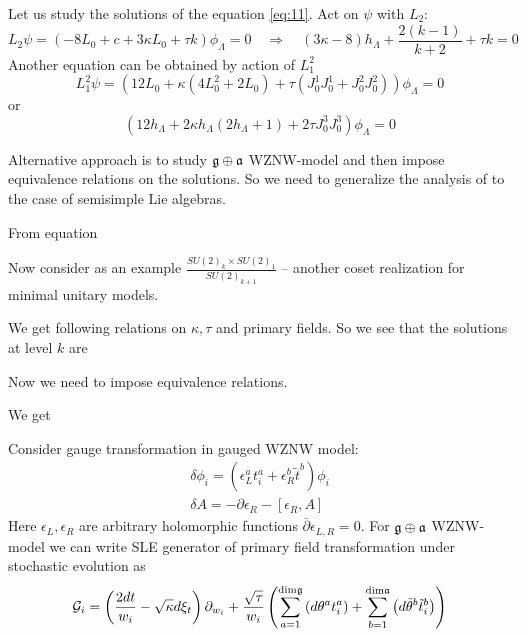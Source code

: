 Let us study the solutions of the equation \eqref{eq:11}. Act on $\psi$ with $L_{2}$:
\begin{equation}
  \label{eq:13}
  L_{2}\psi=(-8L_{0}+c+3\kappa L_{0}+\tau k)\phi_{\Lambda}=0\quad \Longrightarrow\quad  (3\kappa-8) h_{\Lambda}+\frac{2(k-1)}{k+2}+\tau k =0
\end{equation}
Another equation can be obtained by action of $L_{1}^{2}$
\begin{equation}
  \label{eq:15}
  L_{1}^{2}\psi = (12 L_{0} + \kappa(4 L_{0}^{2}+2 L_{0}) +\tau (J_{0}^{1}J_{0}^{1}+J_{0}^{2}J_{0}^{2}))\phi_{\Lambda}=0
\end{equation}
or
\begin{equation}
  \label{eq:16}
  \left(12 h_{\Lambda}+2\kappa h_{\Lambda} (2h_{\Lambda}+1) + 2 \tau J^{3}_{0}J^{3}_{0}\right) \phi_{\Lambda}=0
\end{equation}


Alternative approach is to study $\mathfrak{g}\oplus \mathfrak{a}$ WZNW-model and then impose equivalence relations on the solutions. 
So we need to generalize the analysis of \cite{alekseev2010sle} to the case of semisimple Lie algebras. 

From equation 

Now consider as an example $\frac{SU(2)_{k}\times SU(2)_{1}}{SU(2)_{k+1}}$ -- another coset realization for minimal unitary models. 

We get following relations on $\kappa,\tau$ and primary fields. So we see that the solutions at level $k$ are 

Now we need to impose equivalence relations.


We get 


Consider gauge transformation in gauged WZNW model:
\begin{eqnarray*}
  \delta \phi_{i}=(\epsilon_{L}^{a} t^{a}_{i}+\epsilon^{b}_{R}\tilde{t}^{b})\phi_{i}\\
  \delta A = -\partial \epsilon_{R}-[\epsilon_{R},A]
\end{eqnarray*}
Here $\epsilon_{L}, \epsilon_{R}$ are arbitrary holomorphic functions $\bar\partial\epsilon_{L,R}=0$. 
For  $\mathfrak{g}\oplus \mathfrak{a}$ WZNW-model we can write SLE generator of primary field transformation under stochastic evolution as
\begin{equation*}
  \mathcal{G}_{i}=\left(\frac{2dt}{w_{i}}-\sqrt{\kappa} d\xi_{t}\right) \partial_{w_{i}}+\frac{\sqrt{\tau}}{w_{i}}\left(\sum_{a=1}^{\mathrm{dim} \mathfrak{g}}\left(d \theta ^{a} t^{a}_{i}\right)+\sum_{b=1}^{\mathrm{dim} \mathfrak{a}}\left(d \tilde{\theta} ^{b} \tilde{t}^{b}_{i}\right)\right)
\end{equation*}

